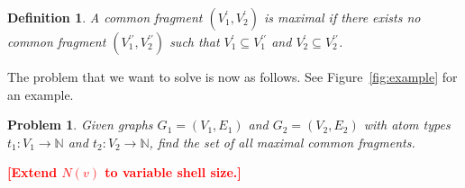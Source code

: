 \documentclass[11pt]{article}
\newcommand{\todo}[1]{\xspace{\bfseries\sffamily\textcolor{red}{[#1]}}\xspace}
\newtheorem{problem}{Problem}[section]
\newtheorem{definition}{Definition}[section]
\begin{document}
\begin{definition}
A common fragment $(V^\prime_1,V^\prime_2)$ is \emph{maximal} if
there exists no common fragment $(V^{\prime\prime}_1,V^{\prime\prime}_2)$ such
that $V^\prime_1 \subseteq V^{\prime\prime}_1$ and $V^\prime_2 \subseteq
V^{\prime\prime}_2$.
\end{definition}

The problem that we want to solve is now as follows. See
Figure~\ref{fig:example} for an example.

\begin{problem}
Given graphs $G_1 = (V_1, E_1)$ and $G_2 = (V_2, E_2)$ with atom types $t_1 :
V_1 \rightarrow \mathbb{N}$ and $t_2 : V_2 \rightarrow \mathbb{N}$, find the
set of all maximal common fragments.
\end{problem}

\todo{Extend $N(v)$ to variable shell size.}
\end{document}
